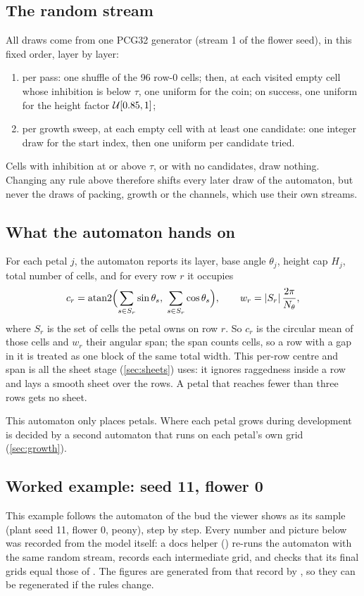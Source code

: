 \subsection{The random stream}\label{sec:ca-stream}
All draws come from one PCG32 generator (stream 1 of the flower seed), in this
fixed order, layer by layer:
\begin{enumerate}[leftmargin=*]
\item per pass: one shuffle of the 96 row-0 cells; then, at each visited empty
  cell whose inhibition is below $\tau$, one uniform for the coin; on success,
  one uniform for the height factor $\mathcal{U}[0.85,1]$;
\item per growth sweep, at each empty cell with at least one candidate: one
  integer draw for the start index, then one uniform per candidate tried.
\end{enumerate}
Cells with inhibition at or above $\tau$, or with no candidates, draw nothing.
Changing any rule above therefore shifts every later draw of the automaton,
but never the draws of packing, growth or the channels, which use their own
streams.

\subsection{What the automaton hands on}\label{sec:ca-output}
For each petal $j$, the automaton reports its layer, base angle $\theta_j$,
height cap $H_j$, total number of cells, and for every row $r$ it occupies
\[
  c_r = \operatorname{atan2}\Bigl(\sum_{s \in S_r} \sin\theta_s,\; \sum_{s\in S_r}\cos\theta_s\Bigr),
  \qquad
  w_r = |S_r|\,\frac{2\pi}{N_\theta},
\]
where $S_r$ is the set of cells the petal owns on row $r$. So $c_r$ is the
circular mean of those cells and $w_r$ their angular span; the span counts
cells, so a row with a gap in it is treated as one block of the same total
width. This per-row centre and span is all the sheet stage
(\cref{sec:sheets}) uses: it ignores raggedness inside a row and lays a
smooth sheet over the rows. A petal that reaches fewer than three rows gets
no sheet.

\begin{remark}
This automaton only places petals. Where each petal grows during development
is decided by a second automaton that runs on each petal's own grid
(\cref{sec:growth}).
\end{remark}

\subsection{Worked example: seed 11, flower 0}\label{sec:ca-example}
This example follows the automaton of the bud the viewer shows as its sample
(plant seed 11, flower 0, peony), step by step. Every number and picture
below was recorded from the model itself: a docs helper
() re-runs the automaton with the same random stream,
records each intermediate grid, and checks that its final grids equal those
of . The figures are generated from that record by
, so they can be regenerated if the rules
change.

